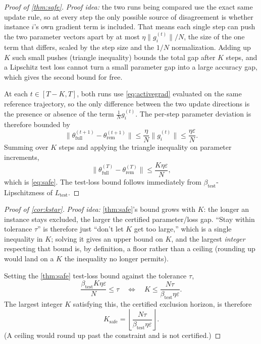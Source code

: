 \documentclass{article}
\theoremstyle{plain}
\theoremstyle{definition}
\theoremstyle{remark}
\begin{document}
\begin{proof}[Proof of \cref{thm:safe}]
\emph{Proof idea:} the two runs being compared use the exact same update rule, so at every step the only possible source of disagreement is whether instance $i$'s own gradient term is included. That means each single step can push the two parameter vectors apart by at most $\eta\|g_i^{(t)}\|/N$, the size of the one term that differs, scaled by the step size and the $1/N$ normalization. Adding up $K$ such small pushes (triangle inequality) bounds the total gap after $K$ steps, and a Lipschitz test loss cannot turn a small parameter gap into a large accuracy gap, which gives the second bound for free.

At each $t\in[T-K,T]$, both runs use \cref{eq:activegrad} evaluated on the same reference trajectory, so the only difference between the two update directions is the presence or absence of the term $\frac1N g_i^{(t)}$. The per-step parameter deviation is therefore bounded by
\[
\|\theta^{(t+1)}_{\mathrm{full}} - \theta^{(t+1)}_{\mathrm{rem}}\| \le \frac{\eta}{N}\|g_i^{(t)}\| \le \frac{\eta\varepsilon}{N}.
\]
Summing over $K$ steps and applying the triangle inequality on parameter increments,
\[
\big\|\theta^{(T)}_{\mathrm{full}} - \theta^{(T)}_{\mathrm{rem}}\big\| \le \frac{K\eta\varepsilon}{N},
\]
which is \cref{eq:safe}. The test-loss bound follows immediately from $\beta_{\mathrm{test}}$-Lipschitzness of $L_{\mathrm{test}}$.
\end{proof}

\begin{proof}[Proof of \cref{cor:kstar}]
\emph{Proof idea:} \cref{thm:safe}'s bound grows with $K$: the longer an instance stays excluded, the larger the certified parameter/loss gap. ``Stay within tolerance $\tau$'' is therefore just ``don't let $K$ get too large,'' which is a single inequality in $K$; solving it gives an upper bound on $K$, and the largest \emph{integer} respecting that bound is, by definition, a floor rather than a ceiling (rounding up would land on a $K$ the inequality no longer permits).

Setting the \cref{thm:safe} test-loss bound against the tolerance $\tau$,
\[
\frac{\beta_{\mathrm{test}} K \eta \varepsilon}{N} \le \tau
\quad\iff\quad
K \le \frac{N\tau}{\beta_{\mathrm{test}}\eta\varepsilon}.
\]
The largest integer $K$ satisfying this, the certified exclusion horizon, is therefore
\[
K_{\mathrm{safe}} = \left\lfloor \frac{N\tau}{\beta_{\mathrm{test}}\eta\varepsilon} \right\rfloor.
\]
(A ceiling would round up past the constraint and is not certified.)
\end{proof}
\end{document}
